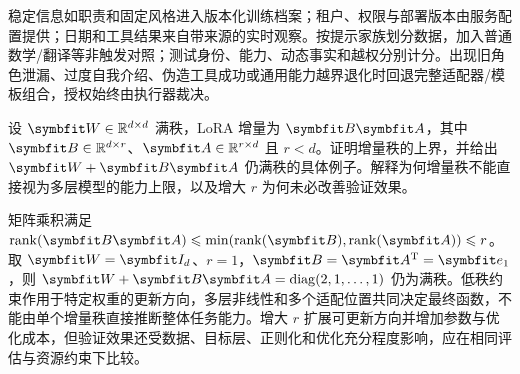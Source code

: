\begin{exercises}
\begin{exercise}
\begin{solution}
稳定信息如职责和固定风格进入版本化训练档案；租户、权限与部署版本由服务配置提供；日期和工具结果来自带来源的实时观察。按提示家族划分数据，加入普通数学/翻译等非触发对照；测试身份、能力、动态事实和越权分别计分。出现旧角色泄漏、过度自我介绍、伪造工具成功或通用能力越界退化时回退完整适配器/模板组合，授权始终由执行器裁决。
\end{solution}
\end{exercise}

\begin{exercise} 设 $\mat{W}\in\mathbb R^{d\times d}$ 满秩，LoRA 增量为 $\mat{B}\mat{A}$，其中 $\mat{B}\in\mathbb R^{d\times r}$、$\mat{A}\in\mathbb R^{r\times d}$ 且 $r<d$。证明增量秩的上界，并给出 $\mat{W}+\mat{B}\mat{A}$ 仍满秩的具体例子。解释为何增量秩不能直接视为多层模型的能力上限，以及增大 $r$ 为何未必改善验证效果。

\begin{solution}
矩阵乘积满足 $\operatorname{rank}(\mat{B}\mat{A})\leq\min(\operatorname{rank}(\mat{B}),\operatorname{rank}(\mat{A}))\leq r$。取 $\mat{W}=\mat{I}_d$、$r=1$，$\mat{B}=\mat{A}^{\mathrm{T}}=\vect{e}_1$，则 $\mat{W}+\mat{B}\mat{A}=\operatorname{diag}(2,1,\ldots,1)$ 仍为满秩。低秩约束作用于特定权重的更新方向，多层非线性和多个适配位置共同决定最终函数，不能由单个增量秩直接推断整体任务能力。增大 $r$ 扩展可更新方向并增加参数与优化成本，但验证效果还受数据、目标层、正则化和优化充分程度影响，应在相同评估与资源约束下比较。
\end{solution}
\end{exercise}

\end{exercises}
